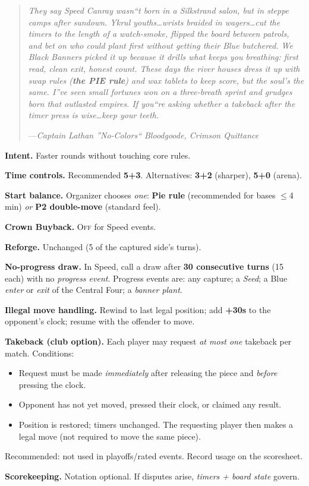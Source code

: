 \documentclass[11pt]{article}
\begin{document}
\begin{quote}\small\itshape
They say Speed Canray wasn``t born in a Silkstrand salon, but in steppe camps after sundown. 
Ykrul youths\dots wrists braided in wagers\dots cut the timers  to the length of a watch-smoke, 
flipped the board between patrols, and bet on who could plant first without getting their Blue butchered. 
We Black Banners picked it up because it drills what keeps you breathing: first read, clean exit, honest count. 
These days the river houses dress it up with swap rules (\textbf{the PIE rule}) and wax tablets to keep score, but the soul's the same. 
I''ve seen small fortunes won on a three-breath sprint and grudges born that outlasted empires. 
If you``re asking whether a takeback after the timer press is wise\dots keep your teeth.

\hfill---\textit{Captain Lathan ''No-Colors`` Bloodgoode, \emph{Crimson Quittance}}
\end{quote}

\bigskip

\begin{rulevariant}[title={Speed Canray (Blitz Variant)}]
\small
\textbf{Intent.} Faster rounds without touching core rules.

\textbf{Time controls.} Recommended \textbf{5+3}. Alternatives: \textbf{3+2} (sharper), \textbf{5+0} (arena).

\textbf{Start balance.} Organizer chooses \emph{one}: \textbf{Pie rule} (recommended for bases $\le$4 min) \emph{or} \textbf{P2 double-move} (standard feel).

\textbf{Crown Buyback.} \textsc{Off} for Speed events.

\textbf{Reforge.} Unchanged (5 of the captured side's turns).

\textbf{No-progress draw.} In Speed, call a draw after \textbf{30 consecutive turns} (15 each) with no \emph{progress event}. Progress events are: any capture; a \emph{Seed}; a Blue \emph{enter} or \emph{exit} of the Central Four; a \emph{banner plant}.

\textbf{Illegal move handling.} Rewind to last legal position; add \textbf{+30s} to the opponent's clock; resume with the offender to move.

\textbf{Takeback (club option).} Each player may request \emph{at most one} takeback per match. Conditions:
\begin{itemize}\itemsep=0.2em
  \item Request must be made \emph{immediately} after releasing the piece and \emph{before} pressing the clock.
  \item Opponent has not yet moved, pressed their clock, or claimed any result.
  \item Position is restored; timers  unchanged. The requesting player then makes a legal move (not required to move the same piece).
\end{itemize}
Recommended: not used in playoffs/rated events. Record usage on the scoresheet.

\textbf{Scorekeeping.} Notation optional. If disputes arise, \emph{timers  + board state} govern.
\end{rulevariant}
\end{document}
